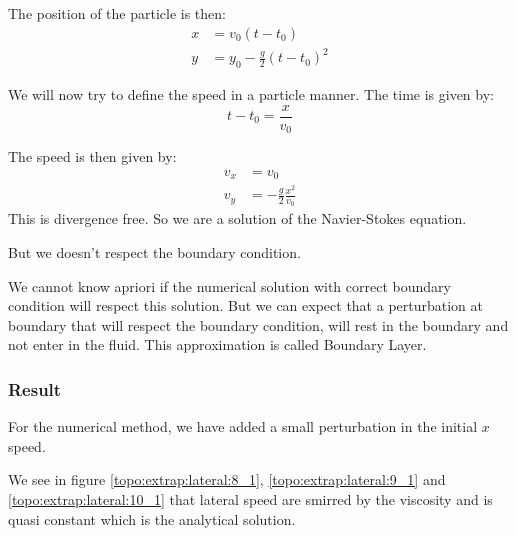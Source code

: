 The position of the particle is then:
\begin{align}
	x&=v_{0}(t-t_0)\\
	y&=y_0-\frac{g}{2}(t-t_0)^2
\end{align}

We will now try to define the speed in a particle manner.
The time is given by:
\begin{equation}
	t-t_{0}=\frac{x}{v_{0}}
\end{equation}

The speed is then given by:
\begin{align}
	v_{x}&=v_{0}\\
	v_{y}&=-\frac{g}{2}\frac{x^2}{v_{0}}
\end{align}
This is divergence free.
So we are a solution of the Navier-Stokes equation.

But we doesn't respect the boundary condition.

We cannot know apriori if the numerical solution with correct boundary condition will respect this solution.
But we can expect that a perturbation at boundary that will respect the boundary condition,
will rest in the boundary and not enter in the fluid.
This approximation is called Boundary Layer.


\subsubsection{Result}


For the numerical method, we have added a small perturbation in the initial $x$ speed.

We see in figure \ref{topo:extrap:lateral:8_1}, \ref{topo:extrap:lateral:9_1} and \ref{topo:extrap:lateral:10_1} that lateral
speed are smirred by the viscosity and is quasi constant which is the analytical solution.

